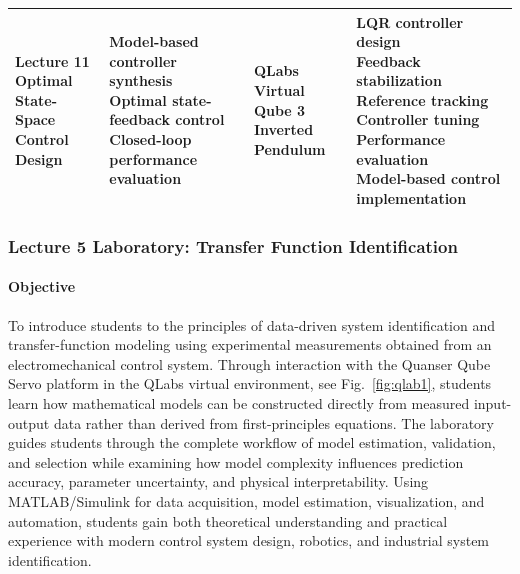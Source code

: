 \documentclass[journal]{IEEEtran}
\begin{document}
\begin{table}[t]
\begin{tabular}{p{} p{} p{} p{}}
\makecell[l]{\textbf{Lecture 11}\\Optimal State-Space\\Control Design}
&
\makecell[l]{Model-based controller synthesis\\Optimal state-feedback control\\Closed-loop performance evaluation}
&
\makecell[l]{QLabs Virtual\\Qube 3\\Inverted Pendulum}
&
\makecell[l]{LQR controller design\\Feedback stabilization\\Reference tracking\\Controller tuning\\Performance evaluation\\Model-based control implementation}
\\
\hline
\end{tabular}
\end{table}


\medskip
\subsubsection{Lecture 5 Laboratory: Transfer Function Identification} 

\paragraph{Objective}
To introduce students to the principles of data-driven system identification and transfer-function modeling using experimental measurements obtained from an electromechanical control system. Through interaction with the Quanser Qube Servo platform in the QLabs virtual environment, see Fig.~\ref{fig:qlab1}, students learn how mathematical models can be constructed directly from measured input-output data rather than derived from first-principles equations. The laboratory guides students through the complete workflow of model estimation, validation, and selection while examining how model complexity influences prediction accuracy, parameter uncertainty, and physical interpretability. Using MATLAB/Simulink for data acquisition, model estimation, visualization, and automation, students gain both theoretical understanding and practical experience with %
modern control system design, robotics, and industrial system identification.
\end{document}
